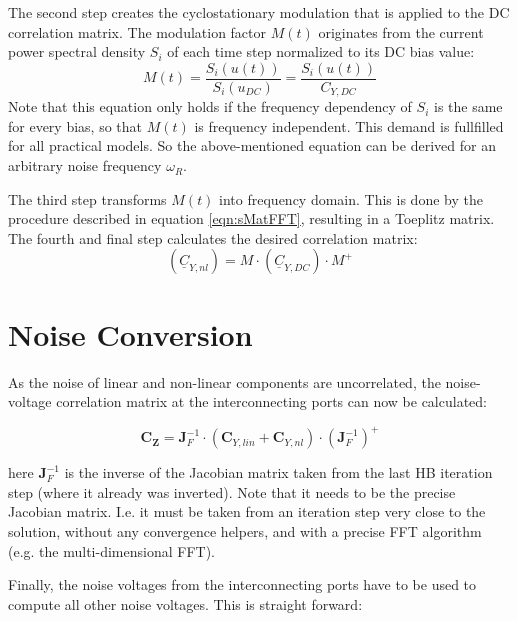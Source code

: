\addvspace{12pt}

The second step creates the cyclostationary modulation that is applied
to the DC correlation matrix. The modulation factor $M(t)$ originates
from the current power spectral density $S_i$ of each time step
normalized to its DC bias value:
\begin{equation}
M(t) = \dfrac{S_i\left( u(t) \right)}{S_i(u_{DC})}
     = \dfrac{S_i\left( u(t) \right)}{C_{Y,DC}}
\end{equation}
Note that this equation only holds if the frequency dependency of
$S_i$ is the same for every bias, so that $M(t)$ is frequency
independent. This demand is fullfilled for all practical models.
So the above-mentioned equation can be derived for an arbitrary
noise frequency $\omega_R$.

\addvspace{12pt}

The third step transforms $M(t)$ into frequency domain. This is done
by the procedure described in equation \ref{eqn:sMatFFT}, resulting
in a Toeplitz matrix.\\
The fourth and final step calculates the desired correlation matrix:
\begin{equation}
(\underline{C}_{Y,nl}) = M \cdot (\underline{C}_{Y,DC}) \cdot M^+
\end{equation}


\section{Noise Conversion}

As the noise of linear and non-linear components are uncorrelated,
the noise-voltage correlation matrix at the interconnecting ports
can now be calculated:

\begin{equation}
\boldsymbol{C_Z} = \boldsymbol{J}_F^{-1} \cdot (\boldsymbol{C}_{Y,lin} + \boldsymbol{C}_{Y,nl})
       \cdot (\boldsymbol{J}_F^{-1})^+
\end{equation}

here $\boldsymbol{J}_F^{-1}$ is the inverse of the Jacobian matrix taken
from the last HB iteration step (where it already was inverted). Note
that it needs to be the precise Jacobian matrix. I.e. it must be taken
from an iteration step very close to the solution, without any convergence
helpers, and with a precise FFT algorithm (e.g. the multi-dimensional FFT).

\addvspace{12pt}

Finally, the noise voltages from the interconnecting ports have to be used
to compute all other noise voltages. This is straight forward:

